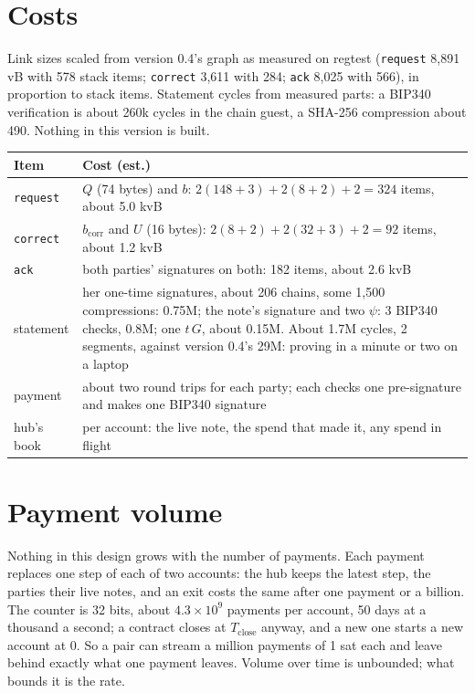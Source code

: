 \documentclass[11pt]{article}
\theoremstyle{plain}
\theoremstyle{definition}
\newcommand{\Tc}{T_{\mathrm{close}}}
\newcommand{\bcorr}{b_{\mathrm{corr}}}
\newcommand{\tx}[1]{\texttt{#1}}
\begin{document}
\section{Costs}\label{sec:costs}

Link sizes scaled from version 0.4's graph as measured on regtest
(\tx{request} 8,891 vB with 578 stack items; \tx{correct} 3,611 with
284; \tx{ack} 8,025 with 566), in proportion to stack items. Statement
cycles from measured parts: a BIP340 verification is about 260k cycles
in the chain guest, a SHA-256 compression about 490. Nothing in this
version is built.

\begin{center}
\begin{tabularx}{\linewidth}{lL}
\toprule
Item & Cost (est.) \\
\midrule
\tx{request} & $Q$ (74 bytes) and $b$: $2(148 + 3) + 2(8 + 2) + 2 = 324$ items, about 5.0 kvB \\
\tx{correct} & $\bcorr$ and $U$ (16 bytes): $2(8 + 2) + 2(32 + 3) + 2 = 92$ items, about 1.2 kvB \\
\tx{ack} & both parties' signatures on both: 182 items, about 2.6 kvB \\
statement & her one-time signatures, about 206 chains, some 1,500 compressions: 0.75M; the note's signature and two $\psi$: 3 BIP340 checks, 0.8M; one $t\,G$, about 0.15M. About 1.7M cycles, 2 segments, against version 0.4's 29M: proving in a minute or two on a laptop \\
payment & about two round trips for each party; each checks one pre-signature and makes one BIP340 signature \\
hub's book & per account: the live note, the spend that made it, any spend in flight \\
\bottomrule
\end{tabularx}
\end{center}

\section{Payment volume}\label{sec:volume-pay}

Nothing in this design grows with the number of payments. Each payment
replaces one step of each of two accounts: the hub keeps the latest
step, the parties their live notes, and an exit costs the same after
one payment or a billion. The counter is 32 bits, about $4.3 \times
10^9$ payments per account, 50 days at a thousand a second; a contract
closes at $\Tc$ anyway, and a new one starts a new account at 0. So a
pair can stream a million payments of 1 sat each and leave behind
exactly what one payment leaves. Volume over time is unbounded; what
bounds it is the rate.
\end{document}
